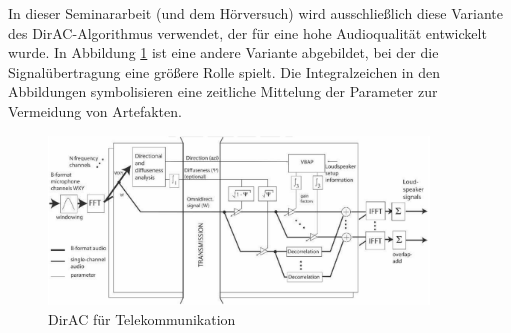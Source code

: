 
In dieser Seminararbeit (und dem Hörversuch) wird ausschließlich diese Variante des DirAC-Algorithmus verwendet, der für eine hohe Audioqualität entwickelt wurde. In Abbildung \ref{fig:dirac_flow_low} ist eine andere Variante abgebildet, bei der die Signalübertragung eine größere Rolle spielt. Die Integralzeichen in den Abbildungen symbolisieren eine zeitliche Mittelung der Parameter zur Vermeidung von Artefakten.

\begin{figure}[!ht]
  \centering
  \includegraphics[width=0.9\textwidth]{funktionsweise/pic/pulkki_dirac_flow_3.png}
  \caption{DirAC für Telekommunikation\protect\footnotemark}
  \label{fig:dirac_flow_low}
\end{figure}

